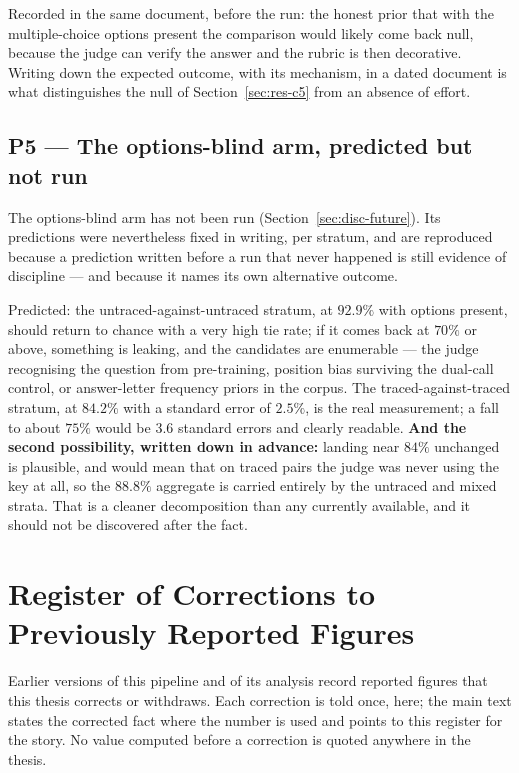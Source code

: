 Recorded in the same document, before the run: the honest prior that
with the multiple-choice options present the comparison would likely
come back null, because the judge can verify the answer and the rubric
is then decorative. Writing down the expected outcome, with its
mechanism, in a dated document is what distinguishes the null of
Section~\ref{sec:res-c5} from an absence of effort.

\subsection*{P5 --- The options-blind arm, predicted but not run}

The options-blind arm has not been run
(Section~\ref{sec:disc-future}). Its predictions were nevertheless
fixed in writing, per stratum, and are reproduced because a prediction
written before a run that never happened is still evidence of
discipline --- and because it names its own alternative outcome.

Predicted: the untraced-against-untraced stratum, at $92.9\%$ with
options present, should return to chance with a very high tie rate;
if it comes back at $70\%$ or above, something is leaking, and the
candidates are enumerable --- the judge recognising the question from
pre-training, position bias surviving the dual-call control, or
answer-letter frequency priors in the corpus.
The traced-against-traced stratum, at $84.2\%$ with a standard error of
$2.5\%$, is the real measurement; a fall to about $75\%$ would be
$3.6$ standard errors and clearly readable.
\textbf{And the second possibility, written down in advance:} landing
near $84\%$ unchanged is plausible, and would mean that on traced pairs
the judge was never using the key at all, so the $88.8\%$ aggregate is
carried entirely by the untraced and mixed strata. That is a cleaner
decomposition than any currently available, and it should not be
discovered after the fact.

\section{Register of Corrections to Previously Reported Figures}\label{app:corrections-register}

Earlier versions of this pipeline and of its analysis record reported
figures that this thesis corrects or withdraws. Each correction is
told once, here; the main text states the corrected fact where the
number is used and points to this register for the story. No value
computed before a correction is quoted anywhere in the thesis.

